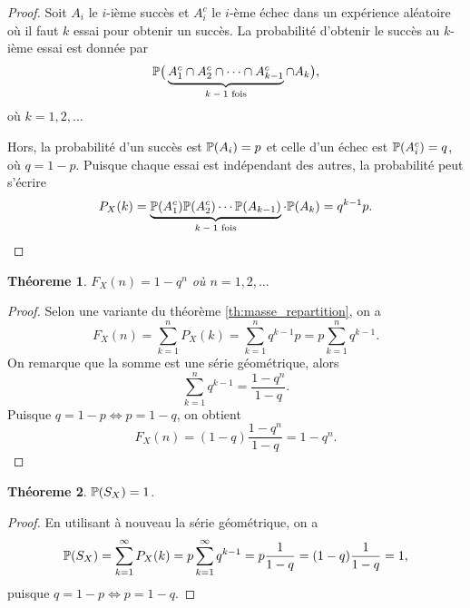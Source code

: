 \documentclass[11pt]{article}
\renewcommand\P{%
	\ensuremath{%
		\mathbb{P}%
	}%
}%
\newtheorem{theoreme}{Théoreme}[section]
\begin{document}
\begin{proof}
	Soit $A_i$ le $i$-ième succès et $A_i^c$ le $i$-ème échec dans un
	expérience aléatoire où il faut $k$ essai pour obtenir un succès. La
	probabilité d'obtenir le succès au $k$-ième essai est donnée par
	\begin{equation*}
		\P\big(
			\underbrace{A_1^c\cap A_2^c\cap\cdots\cap A_{k-1}^c}_
			\text{$k-1$ fois}\cap A_k
		\big),
	\end{equation*}
	où $k=1,2,\dots$

	Hors, la probabilité d'un succès est $\P(A_i)=p$ et celle d'un échec
	est $\P(A_i^c)=q$, où $q=1-p$. Puisque chaque essai est indépendant des
	autres, la probabilité peut s'écrire
	\begin{equation*}
		P_X(k)=
		\underbrace{\P(A_1^c)\P(A_2^c)\cdots\P(A_{k-1})}_\text{$k-1$ fois}
		\cdot\P(A_k)=q^{k-1}p.
	\end{equation*}
\end{proof}

\begin{theoreme}\label{th:repartition_geo}
	$F_X(n)=1-q^n$ où $n=1,2,\dots$
\end{theoreme}

\begin{proof}
	Selon une variante du théorème \ref{th:masse_repartition}, on a
	\begin{equation*}
		F_X(n)=\sum_{k=1}^nP_X(k)=\sum_{k=1}^nq^{k-1}p=p\sum_{k=1}^nq^{k-1}.
	\end{equation*}
	On remarque que la somme est une série géométrique, alors
	\begin{equation*}
		\sum_{k=1}^nq^{k-1}=\frac{1-q^n}{1-q}.
	\end{equation*}
	Puisque $q=1-p\Leftrightarrow p=1-q$, on obtient
	\begin{equation*}
		F_X(n)=(1-q)\frac{1-q^n}{1-q}=1-q^n.
	\end{equation*}
\end{proof}

\begin{theoreme}
	$\P(S_X)=1$.
\end{theoreme}

\begin{proof}
	En utilisant à nouveau la série géométrique, on a
	\begin{equation*}
		\P(S_X)
		=\sum_{k=1}^\infty P_X(k)
		=p\sum_{k=1}^\infty q^{k-1}
		=p\frac{1}{1-q}
		=(1-q)\frac{1}{1-q}
		=1,
	\end{equation*}
	puisque $q=1-p\Leftrightarrow p=1-q$.
\end{proof}
\end{document}
